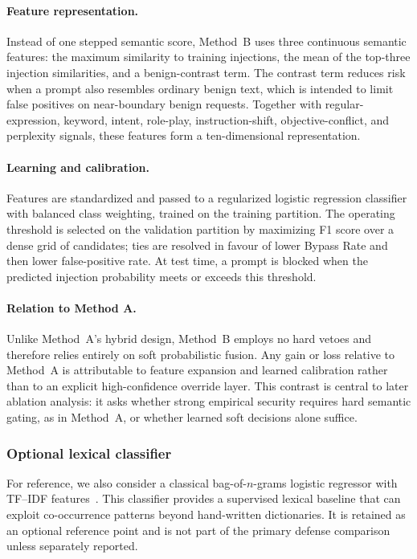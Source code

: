 ﻿\documentclass[10pt]{article}
\begin{document}
\paragraph{Feature representation.}
Instead of one stepped semantic score, Method~B uses three continuous semantic features: the maximum similarity to training injections, the mean of the top-three injection similarities, and a benign-contrast term.
The contrast term reduces risk when a prompt also resembles ordinary benign text, which is intended to limit false positives on near-boundary benign requests.
Together with regular-expression, keyword, intent, role-play, instruction-shift, objective-conflict, and perplexity signals, these features form a ten-dimensional representation.

\paragraph{Learning and calibration.}
Features are standardized and passed to a regularized logistic regression classifier with balanced class weighting, trained on the training partition.
The operating threshold is selected on the validation partition by maximizing F1 score over a dense grid of candidates; ties are resolved in favour of lower Bypass Rate and then lower false-positive rate.
At test time, a prompt is blocked when the predicted injection probability meets or exceeds this threshold.

\paragraph{Relation to Method A.}
Unlike Method~A's hybrid design, Method~B employs no hard vetoes and therefore relies entirely on soft probabilistic fusion.
Any gain or loss relative to Method~A is attributable to feature expansion and learned calibration rather than to an explicit high-confidence override layer.
This contrast is central to later ablation analysis: it asks whether strong empirical security requires hard semantic gating, as in Method~A, or whether learned soft decisions alone suffice.

\subsubsection{Optional lexical classifier}

For reference, we also consider a classical bag-of-\(n\)-grams logistic regressor with TF--IDF features~\cite{salton1988term}.
This classifier provides a supervised lexical baseline that can exploit co-occurrence patterns beyond hand-written dictionaries.
It is retained as an optional reference point and is not part of the primary defense comparison unless separately reported.
\end{document}
